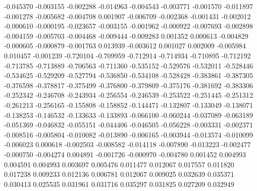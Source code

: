 -0.045370
-0.003155
-0.002288
-0.014963
-0.004543
-0.003771
-0.001570
-0.011897
-0.001278
-0.005682
-0.004708
0.001907
-0.006709
-0.002368
-0.001431
-0.002012
-0.000610
-0.000195
-0.023657
-0.003155
-0.001962
-0.000922
-0.007693
-0.002898
-0.004159
-0.005703
-0.004468
-0.009444
-0.009283
0.001352
0.000613
-0.004829
-0.000605
-0.000879
-0.001763
0.013939
-0.003612
0.001027
0.002009
-0.005984
0.010457
-0.001239
-0.720104
-0.709959
-0.712914
-0.714934
-0.710895
-0.712192
-0.713785
-0.713889
-0.706563
-0.711360
-0.535152
-0.529576
-0.532011
-0.528446
-0.534625
-0.529209
-0.527794
-0.536850
-0.534108
-0.528428
-0.383861
-0.387305
-0.376598
-0.378817
-0.375499
-0.376800
-0.379809
-0.375176
-0.381692
-0.383306
-0.252342
-0.246708
-0.243934
-0.256554
-0.246539
-0.253522
-0.251445
-0.251312
-0.261213
-0.256165
-0.155808
-0.158852
-0.144471
-0.132807
-0.133049
-0.138071
-0.138253
-0.146532
-0.133633
-0.133893
-0.066100
-0.060244
-0.037089
-0.063189
-0.051369
-0.046832
-0.055151
-0.044406
-0.046505
-0.056228
-0.003331
-0.002371
-0.008516
-0.005804
-0.010082
-0.013890
-0.006165
-0.003944
-0.013574
-0.010099
-0.006023
0.000618
-0.002503
-0.008582
-0.014118
-0.007890
-0.013223
-0.002477
-0.000750
-0.004274
0.004891
-0.001726
-0.000970
-0.004780
0.001452
0.004993
0.004591
0.004993
0.003697
0.005476
0.011477
0.012067
0.017557
0.011820
0.017238
0.009233
0.012136
0.006781
0.012067
0.009025
0.032639
0.035371
0.030413
0.025535
0.031961
0.031716
0.035297
0.031825
0.027209
0.032949

